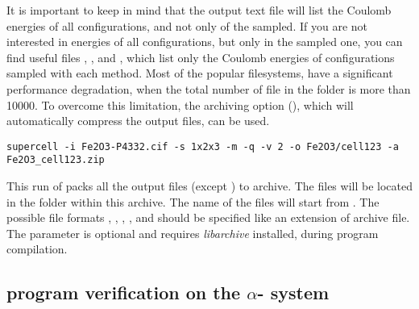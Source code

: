 \documentclass[a4paper,10pt]{article}
\begin{document}
It is important to keep in mind that the output text file  will list the Coulomb energies of all configurations, and not only of the sampled. If you are not interested in energies of all configurations, but only in the sampled one, you can find useful files , , and , which list only the Coulomb energies of configurations sampled with each method. Most of the popular filesystems, have a significant performance degradation, when the total number of file in the folder is more than \num{10000}. To overcome this limitation, the archiving option (), which will automatically compress the output files, can be used.
\begin{Verbatim}[breaklines]
  supercell -i Fe2O3-P4332.cif -s 1x2x3 -m -q -v 2 -o Fe2O3/cell123 -a Fe2O3_cell123.zip
\end{Verbatim}
This run of \sups{} packs all the output files (except ) to  archive. The files will be located in the folder  within this archive. The name of the files will start from . The possible file formats , , , ,  and  should be specified like an extension of archive file. The parameter is optional and requires \textit{libarchive} installed, during program compilation.


\subsection*{\Sups{} program verification on the $\alpha$- system}
\end{document}
